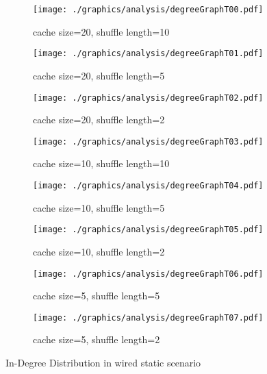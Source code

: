 \begin{figure}
\begin{subfigure}{.5\textwidth}
	\texttt{[image: ./graphics/analysis/degreeGraphT00.pdf]}
	\caption{cache size=20, shuffle
	length=10}
	\label{fig:inDegreeDistT00small}
\end{subfigure}%
\begin{subfigure}{.5\textwidth}
	\texttt{[image: ./graphics/analysis/degreeGraphT01.pdf]}
	\caption{cache size=20, shuffle
	length=5}
	\label{fig:inDegreeDistT01small}
\end{subfigure}
\begin{subfigure}{.5\textwidth}
	\texttt{[image: ./graphics/analysis/degreeGraphT02.pdf]}
	\caption{cache size=20, shuffle
	length=2}
	\label{fig:inDegreeDistT02small}
\end{subfigure}%
\begin{subfigure}{.5\textwidth}
	\texttt{[image: ./graphics/analysis/degreeGraphT03.pdf]}
	\caption{cache size=10, shuffle
	length=10}
	\label{fig:inDegreeDistT03small}
\end{subfigure}
\begin{subfigure}{.5\textwidth}
	\texttt{[image: ./graphics/analysis/degreeGraphT04.pdf]}
	\caption{cache size=10, shuffle
	length=5}
	\label{fig:inDegreeDistT04small}
\end{subfigure}%
\begin{subfigure}{.5\textwidth}
	\texttt{[image: ./graphics/analysis/degreeGraphT05.pdf]}
	\caption{cache size=10, shuffle
	length=2}
	\label{fig:inDegreeDistT05small}
\end{subfigure}
\begin{subfigure}{.5\textwidth}
	\texttt{[image: ./graphics/analysis/degreeGraphT06.pdf]}
	\caption{cache size=5, shuffle
	length=5}
	\label{fig:inDegreeDistT06small}
\end{subfigure}%
\begin{subfigure}{.5\textwidth}
	\texttt{[image: ./graphics/analysis/degreeGraphT07.pdf]}
	\caption{cache size=5, shuffle
	length=2}
	\label{fig:inDegreeDistT07small}
\end{subfigure}
\caption{In-Degree Distribution in wired static scenario}
\end{figure}

\FloatBarrier
